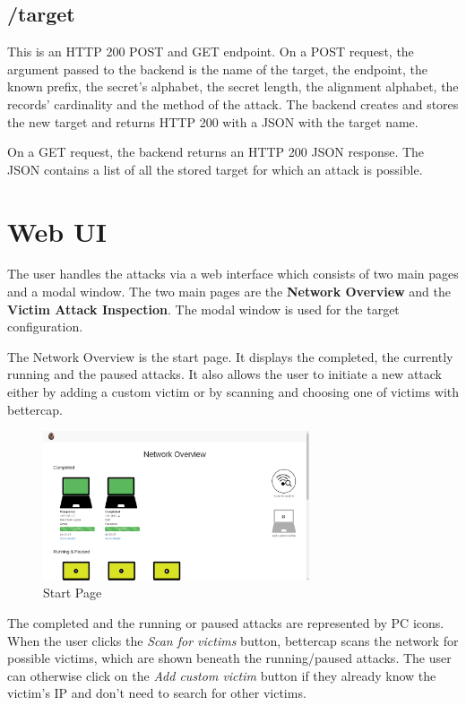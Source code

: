 \subsection{/target}
This is an HTTP 200 POST and GET endpoint.
On a POST request, the argument passed to the backend is the name of the target, 
the endpoint, the known prefix, the secret's alphabet, the secret length, 
the alignment alphabet, the records' cardinality and the method of the attack. 
The backend creates and stores the new target and returns HTTP 200 with a JSON 
with the target name.

On a GET request, the backend returns an HTTP 200 JSON response. The JSON contains 
a list of all the stored target for which an attack is possible.



\section{Web UI}                                                                                                          

The user handles the attacks via a web interface which consists 
of two main pages and a modal window. The two main pages are the
\textbf{Network Overview} and the \textbf{Victim Attack Inspection}. 
The modal window is used for the target configuration.

The Network Overview is the start page. It displays the completed,
 the currently running and the paused attacks. It also allows the user 
to initiate a new attack either by adding a custom victim or by scanning 
and choosing one of victims with bettercap.

\begin{figure}[H] \caption{Start Page} \centering
\includegraphics[width=0.7\textwidth]{diagrams/startPage.png}
\end{figure}

The completed and the running or paused attacks are represented by PC icons. 
When the user clicks the \textit{Scan for victims} button, bettercap scans 
the network for possible victims, which are shown beneath the running/paused attacks.
The user can otherwise click on the \textit{Add custom victim} 
button if they already know the victim’s IP and don’t need to search for other victims.

